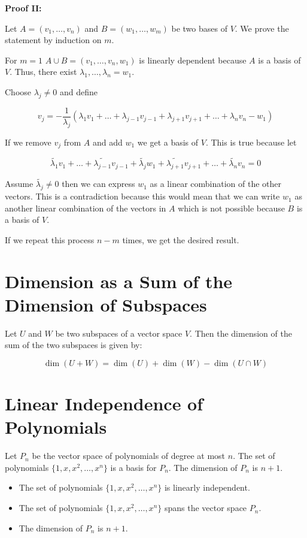 \QED

\textbf{Proof II:}

Let \(A = (v_1, \dots, v_n)\) and \(B = (w_1, \dots, w_m)\) be two bases of \(V\). We prove the statement by induction on \(m\).

For \(m = 1\) \(A \cup B = (v_1, \dots, v_n, w_1)\) is linearly dependent because \(A\) is a basis of \(V\).
Thus, there exist \(\lambda_1, \dots, \lambda_n = w_1\).

Choose \(\lambda_j \ne 0\) and define

\[
	v_j = -\frac{1}{\lambda_j} (\lambda_1 v_1 + \dots + \lambda_{j-1} v_{j-1} + \lambda_{j+1} v_{j+1} + \dots + \lambda_n v_n - w_1 )
\]

If we remove \(v_j\) from \(A\) and add \(w_1\) we get a basis of \(V\). This is true because let

\[
	\tilde{\lambda_1} v_1 + \dots + \tilde{\lambda_{j-1}} v_{j-1} +\tilde{\lambda_j} w_1+ \tilde{\lambda_{j+1}} v_{j+1} + \dots + \tilde{\lambda_n} v_n = 0
\]

Assume \(\tilde{\lambda_j} \ne 0\) then we can express \(w_1\) as a linear combination of the other vectors. This is a contradiction because this would mean
that we can write \(w_1\) as another linear combination of the vectors in \(A\) which is not possible because \(B\) is a basis of \(V\).

If we repeat this process \(n - m\) times, we get the desired result.

\QED

\section{Dimension as a Sum of the Dimension of Subspaces}

Let \(U\) and \(W\) be two subspaces of a vector space \(V\). Then the dimension of the sum of the two
subspaces is given by:

\[
	\dim(U + W) = \dim(U) + \dim(W) - \dim(U \cap W)
\]

\section{Linear Independence of Polynomials}

Let \(P_n\) be the vector space of polynomials of degree at most \(n\). The set of polynomials \(\{1, x, x^2, \ldots, x^n\}\) is a basis for \(P_n\).
The dimension of \(P_n\) is \(n + 1\).

\begin{itemize}

	\item The set of polynomials \(\{1, x, x^2, \ldots, x^n\}\) is linearly independent.

	\item The set of polynomials \(\{1, x, x^2, \ldots, x^n\}\) spans the vector space \(P_n\).

	\item The dimension of \(P_n\) is \(n + 1\).

\end{itemize}

